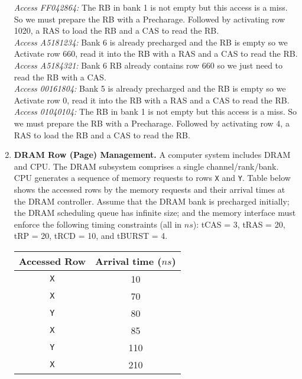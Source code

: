 \documentclass[a4paper, 11pt]{exam}
\begin{document}
\begin{enumerate}
{{\textit{Access FF042864:} The RB in bank 1 is not empty but this access is a miss. So we must prepare the RB with a Precharage. Followed by activating row 1020, a RAS to load the RB and a CAS to read the RB. \\

\textit{Access A5181234:} Bank 6 is already precharged and the RB is empty so we Activate row 660, read it into the RB with a RAS and a CAS to read the RB. \\

\textit{Access A5184321:} Bank 6 RB already contains row 660 so we just need to read the RB with a CAS. \\

\textit{Access 00161804:} Bank 5 is already precharged and the RB is empty so we Activate row 0, read it into the RB with a RAS and a CAS to read the RB. \\

\textit{Access 01040104:} The RB in bank 1 is not empty but this access is a miss. So we must prepare the RB with a Precharage. Followed by activating row 4, a RAS to load the RB and a CAS to read the RB.
}}

\item \textbf{DRAM Row (Page) Management.}
A computer system includes DRAM and CPU.
The DRAM subsystem comprises a single channel/rank/bank.
CPU generates a sequence of memory requests to rows \texttt{X} and \texttt{Y}.
Table below shows the accessed rows by the memory requests and their arrival times at the DRAM controller.
Assume that the DRAM bank is precharged initially; the DRAM scheduling queue has infinite size; and the memory interface must enforce the following timing constraints (all in $ns$):
tCAS = 3, tRAS = 20, tRP = 20, tRCD = 10, and tBURST = 4. 

\begin{center}
	\begin{tabular}{|c|c|}
		\hline
		\textbf{Accessed Row} & \textbf{Arrival time ($ns$)} \\
		\hline
		\texttt{X}  & 10 \\
		\hline
		\texttt{X}  & 70 \\
		\hline
		\texttt{Y}  & 80 \\
		\hline
		\texttt{X}  & 85 \\
		\hline
		\texttt{Y}  & 110 \\
		\hline
		\texttt{X} & 210 \\
		\hline
	\end{tabular}
\end{center}


\end{enumerate}
\end{document}
